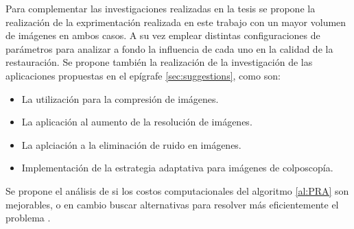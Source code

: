 \begin{recomendations}\label{chapter:Recomendations}

Para complementar las investigaciones realizadas en la tesis se propone la realizaci\'on de la exprimentaci\'on realizada en este trabajo con un mayor volumen de im\'agenes en ambos casos. A su vez emplear distintas configuraciones de par\'ametros para analizar a fondo la influencia de cada uno en la calidad de la restauraci\'on. Se propone tambi\'en la realizaci\'on de la investigaci\'on de las aplicaciones propuestas en el epígrafe \ref{sec:suggestions}, como son:
\begin{itemize}
	\item La utilizaci\'on para la compresi\'on de im\'agenes.
	\item La aplicaci\'on al aumento de la resoluci\'on de im\'agenes.
	\item La aplciaci\'on a la eliminaci\'on de ruido en im\'agenes.
	\item Implementaci\'on de la estrategia adaptativa para im\'agenes de colposcop\'ia.
\end{itemize}
Se propone el an\'alisis de si los costos computacionales del algoritmo \ref{al:PRA} son mejorables, o en cambio buscar alternativas para resolver m\'as eficientemente el problema \TSP. 


\end{recomendations}
